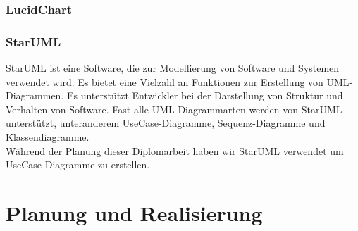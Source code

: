 \documentclass{report}
\begin{document}
\subsection{LucidChart}
\subsection{StarUML}
StarUML ist eine Software, die zur Modellierung von Software und Systemen verwendet wird. Es bietet eine Vielzahl an Funktionen zur Erstellung von UML-Diagrammen. Es unterstützt Entwickler bei der Darstellung von Struktur und Verhalten von Software. Fast alle UML-Diagrammarten werden von StarUML unterstützt, unteranderem UseCase-Diagramme, Sequenz-Diagramme und Klassendiagramme.
\\
Während der Planung dieser Diplomarbeit haben wir StarUML verwendet um UseCase-Diagramme zu erstellen.

\chapter{Planung und Realisierung}
\end{document}

